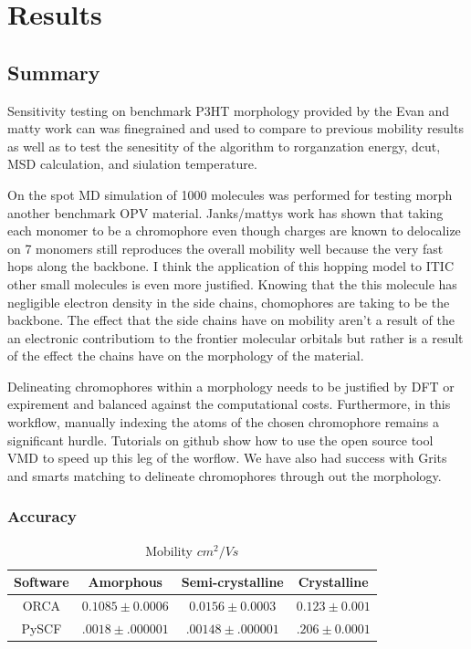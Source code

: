 \chapter{Results}
\label{chap:results}

\section{Summary}
Sensitivity testing on benchmark P3HT morphology provided by the Evan and matty work can was finegrained and
used to compare to previous mobility results as well as to test the senesitity of the algorithm to
rorganzation energy, dcut, MSD calculation, and siulation temperature.

On the spot MD simulation of 1000
molecules was performed for testing morph another benchmark OPV material. Janks/mattys work has shown that taking
each monomer to be a chromophore even though charges are known to delocalize on 7 monomers still reproduces
the overall mobility well because the very fast hops along the backbone. I think the application of this
hopping model to ITIC other small molecules is even more justified. Knowing that the this molecule has
negligible electron density in the side chains, chomophores are taking to be the backbone. The effect that
the side chains have on mobility aren't a result of the an electronic contributiom to the frontier molecular
orbitals but rather is a result of the effect the chains have on the morphology of the material. 

Delineating chromophores within a morphology needs to be justified by DFT or expirement and balanced against
the computational costs. Furthermore, in this workflow, manually indexing the atoms of the chosen chromophore
remains a significant hurdle. Tutorials on github show how to use the open source tool VMD to speed up this
leg of the worflow. We have also had success with Grits and smarts matching to delineate chromophores through
out the morphology. 

\subsection{Accuracy}

\begin{table}[ht]
    \caption{Mobility $cm^{2}/Vs$} %
\centering %
\begin{tabular}{c c c c} %
\hline\hline %
Software & Amorphous & Semi-crystalline & Crystalline \\ [0.5ex] %
\hline %
    ORCA & $0.1085 \pm 0.0006$ & $0.0156 \pm 0.0003$ & $0.123 \pm 0.001$ \\ %
PySCF & $.0018 \pm .000001$ & $.00148 \pm .000001$ & $.206 \pm 0.0001$ \\ [1ex] %
\hline %
\end{tabular}
\label{table:nonlin} %
\end{table}

